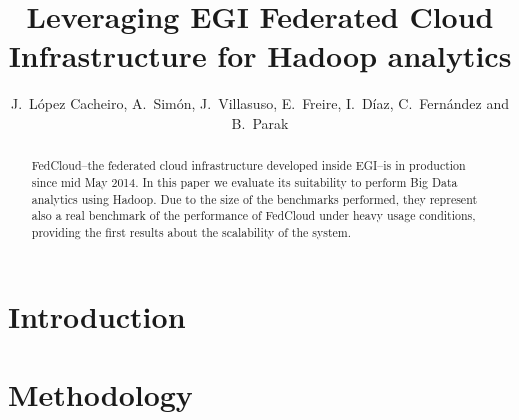 \documentclass[oribibl]{llncs_Ibergrid2013}
\begin{document}
%
\frontmatter          %
%
\pagestyle{headings}  %
%
\mainmatter              %
%
\title{Leveraging EGI Federated Cloud Infrastructure for Hadoop analytics}
%
%
\author{J.~L\'opez Cacheiro, A.~Sim\'on, J.~Villasuso, E.~Freire, I.~D\'iaz, C.~Fern\'andez and B.~Parak}
%
%
%




\maketitle              %

\begin{abstract}
FedCloud--the federated cloud infrastructure developed inside EGI--is in production since mid May 2014. In this paper we evaluate its suitability to perform Big Data analytics using Hadoop. Due to the size of the benchmarks performed, they represent also a real benchmark of the performance of FedCloud under heavy usage conditions, providing the first results about the scalability of the system.


\end{abstract}

%
\section{Introduction}
\label{sect-introduction}


\section{Methodology}
\label{sect-methodology}

\end{document}
